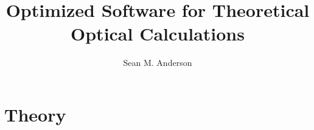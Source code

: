 \documentclass{book}
\title{Optimized Software for Theoretical Optical Calculations}
\author{Sean M. Anderson}
\begin{document}
\frontmatter
\maketitle
\tableofcontents

\mainmatter
\chapter{Theory}\label{ch:theory}


\appendix
% 
% 
% 
% 
% 
% 
% 
% 



\end{document}
